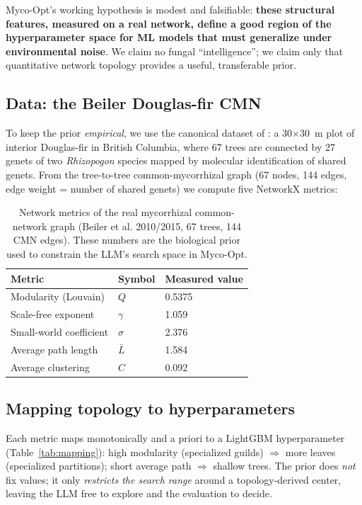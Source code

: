 \documentclass[11pt]{article}
\begin{document}
Myco-Opt's working hypothesis is modest and falsifiable: \textbf{these
structural features, measured on a real network, define a good region of the
hyperparameter space for ML models that must generalize under environmental
noise}. We claim no fungal ``intelligence''; we claim only that quantitative
network topology provides a useful, transferable prior.

\subsection{Data: the Beiler Douglas-fir CMN}
\label{sec:data-prior}

To keep the prior \emph{empirical}, we use the canonical dataset of
\citet{beiler2010,beiler2015}: a 30$\times$30~m plot of interior Douglas-fir in
British Columbia, where 67 trees are connected by 27 genets of two
\emph{Rhizopogon} species mapped by molecular identification of shared genets.
From the tree-to-tree common-mycorrhizal graph (67 nodes, 144 edges, edge
weight = number of shared genets) we compute five NetworkX
\citep{hagberg2008} metrics:

\begin{table}[t]
\centering
\small
\begin{tabular}{lll}
\toprule
Metric & Symbol & Measured value \\
\midrule
Modularity (Louvain) & $Q$ & 0.5375 \\
Scale-free exponent & $\gamma$ & 1.059 \\
Small-world coefficient & $\sigma$ & 2.376 \\
Average path length & $\bar L$ & 1.584 \\
Average clustering & $C$ & 0.092 \\
\bottomrule
\end{tabular}
\caption{Network metrics of the real mycorrhizal common-network graph
(Beiler et al. 2010/2015, 67 trees, 144 CMN edges). These numbers are the
biological prior used to constrain the LLM's search space in Myco-Opt.}
\label{tab:metrics}
\end{table}

\subsection{Mapping topology to hyperparameters}
\label{sec:mapping}

Each metric maps monotonically and a priori to a LightGBM hyperparameter
\citep{ke2017} (Table~\ref{tab:mapping}): high modularity (specialized guilds)
$\Rightarrow$ more leaves (specialized partitions); short average path
$\Rightarrow$ shallow trees. The prior does \emph{not} fix values; it only
\emph{restricts the search range} around a topology-derived center, leaving the
LLM free to explore and the evaluation to decide.
\end{document}
